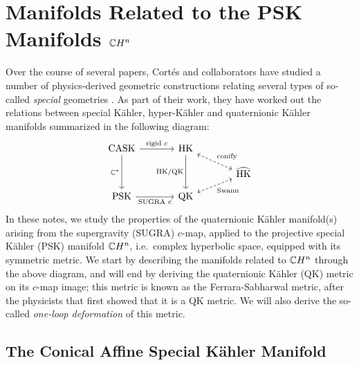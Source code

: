 \section{Manifolds Related to the PSK Manifolds \texorpdfstring{$\mathbb{C} H^n$}{Complex Hyperbolic Space}}\label{sec:FSfromHKQK}

Over the course of several papers, Cort\'es and collaborators have studied a number of physics-derived geometric constructions relating several types of so-called \emph{special} geometries \cite{CDS2017,CHM2012,ACDM2015,ACM2013,CDMV2015}. As part of their work, they have worked out the relations between special K\"ahler, hyper-K\"ahler and quaternionic K\"ahler manifolds summarized in the following diagram:
\begin{equation*}
	\begin{tikzcd}[row sep=small,column sep=large]
		\text{CASK} \ar[r,"\text{rigid }c"] \ar[dd,"\C^*"'] & \text{HK} 
		\ar[dd,"\text{HK/QK}"'] \ar[dr,dashed, leftrightarrow,"\text{conify}"] & \\
		& & \widehat{\text{HK}}\\
		\text{PSK} \ar[r,"\text{SUGRA }c"'] & \text{QK} \ar[ur,leftrightarrow,dashed,"\text{Swann}"'] &
	\end{tikzcd}
\end{equation*}
In these notes, we study the properties of the quaternionic K\"ahler manifold(s) arising from the supergravity (SUGRA) $c$-map, applied to the projective special K\"ahler (PSK) manifold $\mathbb{C} H^n$, i.e.~complex hyperbolic space, equipped with its symmetric metric. We start by describing the manifolds related to $\mathbb{C} H^n$ through the above diagram, and will end by deriving the quaternionic K\"ahler (QK) metric on its $c$-map image; this metric is known as the Ferrara-Sabharwal metric, after the physicists that first showed that it is a QK metric. We will also derive the so-called \emph{one-loop deformation} of this metric.

\subsection{The Conical Affine Special K\"ahler Manifold}

